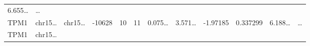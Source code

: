 \documentclass[
]{article}
\begin{document}
\begin{longtable}[]{@{}llllllllllll@{}}
\begin{minipage}[t]{0.09\columnwidth}
6.655\ldots{}\strut
\end{minipage} & \begin{minipage}[t]{0.02\columnwidth}\raggedright
\ldots{}\strut
\end{minipage}\tabularnewline
\begin{minipage}[t]{0.06\columnwidth}\raggedright
TPM1\strut
\end{minipage} & \begin{minipage}[t]{0.06\columnwidth}\raggedright
chr15\ldots{}\strut
\end{minipage} & \begin{minipage}[t]{0.06\columnwidth}\raggedright
chr15\ldots{}\strut
\end{minipage} & \begin{minipage}[t]{0.06\columnwidth}\raggedright
-10628\strut
\end{minipage} & \begin{minipage}[t]{0.06\columnwidth}\raggedright
10\strut
\end{minipage} & \begin{minipage}[t]{0.06\columnwidth}\raggedright
11\strut
\end{minipage} & \begin{minipage}[t]{0.06\columnwidth}\raggedright
0.075\ldots{}\strut
\end{minipage} & \begin{minipage}[t]{0.08\columnwidth}\raggedright
3.571\ldots{}\strut
\end{minipage} & \begin{minipage}[t]{0.06\columnwidth}\raggedright
-1.97185\strut
\end{minipage} & \begin{minipage}[t]{0.06\columnwidth}\raggedright
0.337299\strut
\end{minipage} & \begin{minipage}[t]{0.09\columnwidth}\raggedright
6.188\ldots{}\strut
\end{minipage} & \begin{minipage}[t]{0.02\columnwidth}\raggedright
\ldots{}\strut
\end{minipage}\tabularnewline
\begin{minipage}[t]{0.06\columnwidth}\raggedright
TPM1\strut
\end{minipage} & \begin{minipage}[t]{0.06\columnwidth}\raggedright
chr15\ldots{}\strut
\end{minipage} & \begin{minipage}[t]{0.06\columnwidth}\raggedright

\end{minipage}
\end{longtable}
\end{document}
